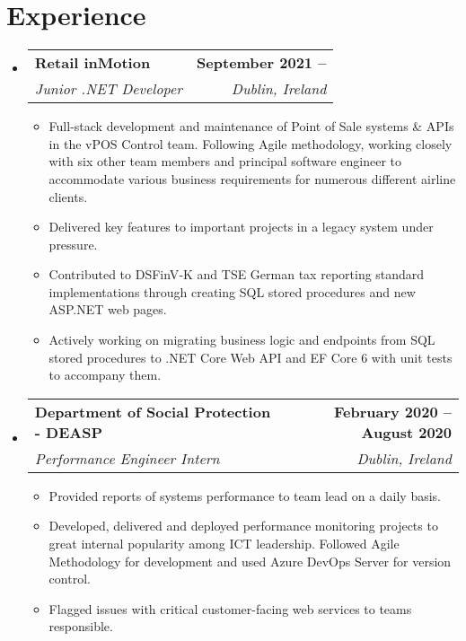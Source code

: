\documentclass[letterpaper,11pt]{article}
\makeatletter
\newcommand{\resumeItem}[1]{
  \item\small{
    {#1 \vspace{-2pt}}
  }
}
\newcommand{\resumeSubheading}[4]{
  \vspace{-2pt}\item
    \begin{tabular*}{1.0\textwidth}[t]{l@{\extracolsep{\fill}}r}
      \textbf{#1} & \textbf{\small #2} \\
      \textit{\small#3} & \textit{\small #4} \\
    \end{tabular*}\vspace{-7pt}
}
\newcommand{\resumeSubHeadingListStart}{\begin{itemize}[leftmargin=0.0in, label={}]}
\newcommand{\resumeSubHeadingListEnd}{\end{itemize}}
\newcommand{\resumeItemListStart}{\begin{itemize}}
\newcommand{\resumeItemListEnd}{\end{itemize}\vspace{-5pt}}
\makeatother
\begin{document}
\section{Experience}
\resumeSubHeadingListStart

\resumeSubheading
{Retail inMotion}{September 2021 -- }
{Junior .NET Developer}{Dublin, Ireland}
\resumeItemListStart
\resumeItem{Full-stack development and maintenance of Point of Sale systems \& APIs in the vPOS Control team. Following Agile methodology, working closely with six other team members and principal software engineer to accommodate various business requirements for numerous different airline clients.}
\resumeItem{Delivered key features to important projects in a legacy system under pressure.}
\resumeItem{Contributed to DSFinV‑K and TSE German tax reporting standard implementations through creating SQL stored procedures and new ASP.NET web pages.}
\resumeItem{Actively working on migrating business logic and endpoints from SQL stored procedures to .NET Core Web API and EF Core 6 with unit tests to accompany them. }
\resumeItemListEnd

\resumeSubheading
{Department of Social Protection - DEASP}{February 2020 -- August 2020}
{Performance Engineer Intern}{Dublin, Ireland}
\resumeItemListStart
\resumeItem{Provided reports of systems performance to team lead on a daily basis.}
\resumeItem{Developed, delivered and deployed performance monitoring projects to great internal popularity among ICT leadership. Followed Agile Methodology for development and used Azure DevOps Server for version control.}
\resumeItem{Flagged issues with critical customer-facing web services to teams responsible.}
\resumeItemListEnd
\vspace{-5pt}    
\resumeSubHeadingListEnd
\vspace{-10pt}

\end{document}
